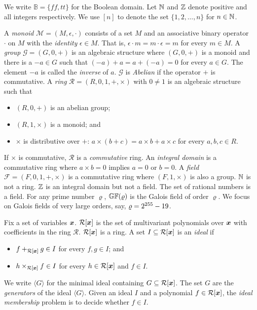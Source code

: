 
We write $\mathbb{B} = \{ \mathit{ff}, \mathit{tt} \}$ for the Boolean
domain. Let $\mathbb{N}$ and $\mathbb{Z}$ denote positive and all integers
respectively. We use $[n]$ to denote the set $\{ 1, 2, \ldots, n \}$
for $n \in \mathbb{N}$. 

A \emph{monoid} $\mathcal{M} = (M, \epsilon, \cdot)$ consists of a set
$M$ and an associative binary operator $\cdot$ on $M$ with the
\emph{identity} $\epsilon \in M$. That is, $\epsilon \cdot m = m \cdot
\epsilon = m$ for every $m \in M$.
A \emph{group} $\mathcal{G} = (G, 0, +)$ is an algebraic structure
where $(G, 0, +)$ is a monoid and there is a $-a \in G$ such that
$(-a) + a = a + (-a) = 0$ for every $a \in G$. The element $-a$ is
called the \emph{inverse} of $a$. $\mathcal{G}$ is \emph{Abelian} if
the operator $+$ is commutative.
A \emph{ring} $\mathcal{R} = (R, 0, 1, +, \times)$ with $0 \neq 1$ is
an algebraic structure such that
\begin{itemize}
\item $(R, 0, +)$ is an abelian group; 
\item $(R, 1, \times)$ is a monoid; and 
\item $\times$ is distributive over $+$: $a \times (b + c) = a \times
  b + a \times c$ for every $a, b, c \in R$.
\end{itemize}
If $\times$ is commutative, $\mathcal{R}$ is a \emph{commutative}
ring. An \emph{integral domain} is a commutative ring where $a \times
b = 0$ implies $a = 0$ or $b = 0$. A \emph{field} $\mathcal{F} = (F,
0, 1, +, \times)$ is a commutative ring where $(F, 1, \times)$ is also
a group. $\mathbb{N}$ is not a ring. $\mathbb{Z}$ is an integral domain but not
a field. The set of rational numbers is a field. 
For any prime number $\varrho$, $\mathbb{GF}(\varrho)$
is the Galois field of order $\varrho$. We focus on Galois fields of
very large orders, say, $\varrho = 2^{255} - 19$. 

Fix a set of variables $\vx$. $\mathcal{R}[\vx]$ is the set of
multivariant polynomials over $\vx$ with coefficients in the ring
$\mathcal{R}$. $\mathcal{R}[\vx]$ is a ring. A set $I \subseteq
\mathcal{R}[\vx]$ is an \emph{ideal} if 
\begin{itemize}
\item $f +_{\mathcal{R}[\vx]} g \in I$ for every $f, g \in I$; and
\item $h \times_{\mathcal{R[\vx]}} f \in I$ for every $h \in
  \mathcal{R}[\vx]$ and $f \in I$. 
\end{itemize}
We write $\langle G \rangle$ for the minimal ideal containing $G
\subseteq \mathcal{R}[\vx]$. The set $G$ are the \emph{generators}
of the ideal $\langle G \rangle$. Given an ideal $I$ and a
polynomial $f \in \mathcal{R}[\vx]$, the \emph{ideal membership}
problem is to decide whether $f \in I$.